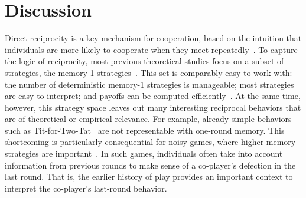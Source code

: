 \documentclass[9pt,twocolumn,twoside]{pnas-new}
\begin{document}

\section*{Discussion}

Direct reciprocity is a key mechanism for cooperation, based on the intuition that individuals are more likely to cooperate when they meet repeatedly~\citep{nowak:Science:2006}.
To capture the logic of reciprocity, most previous theoretical studies focus on a subset of strategies, the  memory-1 strategies~\citep{nowak:Nature:1993,imhof:PNAS:2005,grujic:jtb:2012,van-segbroeck:prl:2012,press:PNAS:2012,stewart:pnas:2013,Toupo:IJBC:2014,stewart:pnas:2014, akin:EGADS:2016,glynatsi:scientific:2020,chen:PNASnexus:2023}. 
This set is comparably easy to work with: 
the number of deterministic memory-1 strategies is manageable; most strategies are easy to interpret; and payoffs can be computed efficiently~\citep{sigmund2010}. 
At the same time, however, this strategy space leaves out many interesting reciprocal behaviors that are of theoretical or empirical relevance.
For example, already simple behaviors such as Tit-for-Two-Tat~\citep{axelrod:AAAS:1981} are not representable with one-round memory.
This shortcoming is particularly consequential for noisy games, where higher-memory strategies are important~\cite{fudenberg:AER:2012}. 
In such games, individuals often take into account information from previous rounds to make sense of a co-player's defection in the last round. 
That is, the earlier history of play provides an important context to interpret the co-player's last-round behavior. 
\end{document}
